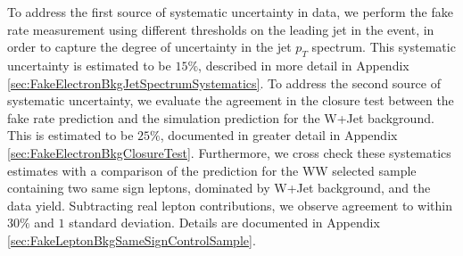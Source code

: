 To address the first source of systematic uncertainty in data, we perform the
fake rate measurement using different thresholds on the leading jet
in the event, in order to capture the degree of uncertainty in 
the jet $p_{T}$ spectrum. This systematic uncertainty is estimated to 
be $15\%$, described in more detail in Appendix 
\ref{sec:FakeElectronBkgJetSpectrumSystematics}. To address the second 
source of systematic uncertainty, we evaluate the agreement in the closure
test between the fake rate prediction and the simulation prediction for 
the W+Jet background. This is estimated to be $25\%$, documented in greater 
detail in Appendix \ref{sec:FakeElectronBkgClosureTest}. Furthermore, we
cross check these systematics estimates with a comparison of the prediction 
for the WW selected sample containing two same sign leptons, dominated by W+Jet
background, and the data yield. Subtracting real lepton contributions,
we observe agreement to within $30\%$ and $1$ standard deviation. Details
are documented in Appendix \ref{sec:FakeLeptonBkgSameSignControlSample}.



